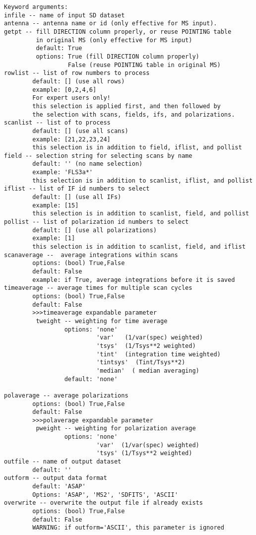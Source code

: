 \begin{verbatim}
Keyword arguments:
infile -- name of input SD dataset
antenna -- antenna name or id (only effective for MS input). 
getpt -- fill DIRECTION column properly, or reuse POINTING table 
         in original MS (only effective for MS input)
         default: True
         options: True (fill DIRECTION column properly)
                  False (reuse POINTING table in original MS)
rowlist -- list of row numbers to process
        default: [] (use all rows)
        example: [0,2,4,6]
        For expert users only!
        this selection is applied first, and then followed by 
        the selection with scans, fields, ifs, and polarizations. 
scanlist -- list of to process
        default: [] (use all scans)
        example: [21,22,23,24]
        this selection is in addition to field, iflist, and pollist
field -- selection string for selecting scans by name
        default: '' (no name selection)
        example: 'FLS3a*'
        this selection is in addition to scanlist, iflist, and pollist
iflist -- list of IF id numbers to select
        default: [] (use all IFs)
        example: [15]
        this selection is in addition to scanlist, field, and pollist
pollist -- list of polarization id numbers to select
        default: [] (use all polarizations)
        example: [1]
        this selection is in addition to scanlist, field, and iflist
scanaverage --  average integrations within scans
        options: (bool) True,False
        default: False
        example: if True, average integrations before it is saved
timeaverage -- average times for multiple scan cycles
        options: (bool) True,False
        default: False
        >>>timeaverage expandable parameter
         tweight -- weighting for time average
                 options: 'none'
                          'var'   (1/var(spec) weighted)
                          'tsys'  (1/Tsys**2 weighted)
                          'tint'  (integration time weighted)
                          'tintsys'  (Tint/Tsys**2)
                          'median'  ( median averaging)
                 default: 'none'

polaverage -- average polarizations
        options: (bool) True,False
        default: False
        >>>polaverage expandable parameter
         pweight -- weighting for polarization average
                 options: 'none'
                          'var'  (1/var(spec) weighted)
                          'tsys' (1/Tsys**2 weighted)
outfile -- name of output dataset
        default: '' 
outform -- output data format
        default: 'ASAP'
        Options: 'ASAP', 'MS2', 'SDFITS', 'ASCII'
overwrite -- overwrite the output file if already exists
        options: (bool) True,False
        default: False
        WARNING: if outform='ASCII', this parameter is ignored
\end{verbatim}

